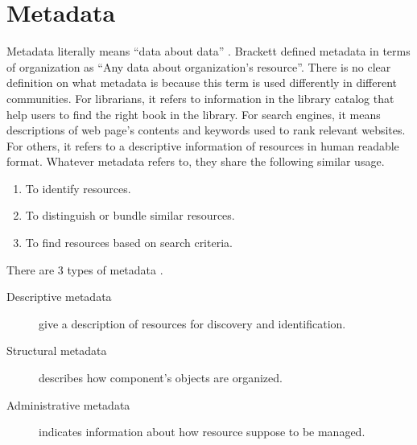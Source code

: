 \section{Metadata}
Metadata literally means \enquote{data about data} \cite[p.~1]{baca_2008}.
Brackett \cite[p.149]{brackett_2000} defined metadata in terms of organization as \enquote{Any data about organization's resource}.
There is no clear definition on what metadata is because this term is used differently in different communities.
For librarians, it refers to information in the library catalog that help users to find the right book in the library.
For search engines, it means descriptions of web page's contents and keywords used to rank relevant websites.
For others, it refers to a descriptive information of resources in human readable format.
Whatever metadata refers to, they share the following similar usage.
\begin{enumerate}
	\item To identify resources.
	\item To distinguish or bundle similar resources.
	\item To find resources based on search criteria.
\end{enumerate}
There are 3 types of metadata \cite{hodge_2001}.
\begin{description}
	\item[Descriptive metadata] give a description of resources for discovery and identification.
	\item[Structural metadata] describes how component's objects are organized.
	\item[Administrative metadata] indicates information about how resource suppose to be managed.
\end{description}

